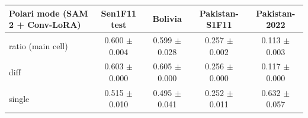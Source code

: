 \begin{tabular}{lcccc}
\toprule
Polari mode (SAM 2 + Conv-LoRA) & Sen1F11 test & Bolivia & Pakistan-S1F11 & Pakistan-2022 \\
\midrule
ratio (main cell) & 0.600 $\pm$ 0.004 & 0.599 $\pm$ 0.028 & 0.257 $\pm$ 0.002 & 0.113 $\pm$ 0.003 \\
diff & 0.603 $\pm$ 0.000 & 0.605 $\pm$ 0.000 & 0.256 $\pm$ 0.000 & 0.117 $\pm$ 0.000 \\
single & 0.515 $\pm$ 0.010 & 0.495 $\pm$ 0.041 & 0.252 $\pm$ 0.011 & 0.632 $\pm$ 0.057 \\
\bottomrule
\end{tabular}
